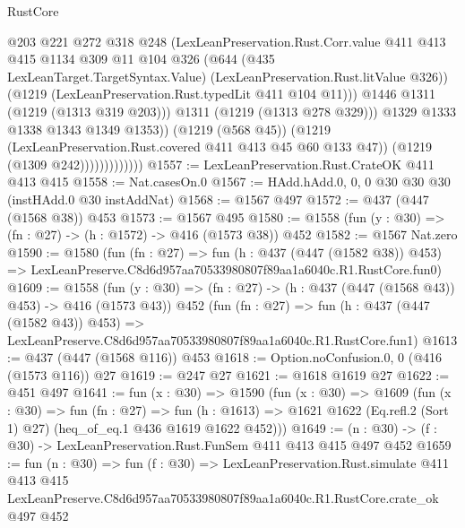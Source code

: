 \begin{lexlean}{RustCore}
\begin{coremodule}
                                  @203
                                  @221
                                  @272
                                  @318
                                  @248
                                  (LexLeanPreservation.Rust.Corr.value
                                    @411
                                    @413
                                    @415
                                    @1134
                                    @309
                                    @11
                                    @104
                                    @326
                                    (@644
                                      (@435 LexLeanTarget.TargetSyntax.Value)
                                      (LexLeanPreservation.Rust.litValue @326))
                                    (@1219 (LexLeanPreservation.Rust.typedLit @411 @104 @11)))
                                  @1446
                                  @1311
                                  (@1219 (@1313 @319 @203)))
                                @1311
                                (@1219 (@1313 @278 @329)))
                              @1329
                              @1333
                              @1338
                              @1343
                              @1349
                              @1353))
                          (@1219 (@568 @45))
                          (@1219 (LexLeanPreservation.Rust.covered @411 @413 @45 @60 @133 @47))
                          (@1219 (@1309 @242)))))))))))))
@1557 := LexLeanPreservation.Rust.CrateOK @411 @413 @415
@1558 := Nat.casesOn.{0}
@1567 := HAdd.hAdd.{0, 0, 0} @30 @30 @30 (instHAdd.{0} @30 instAddNat)
@1568 := @1567 @497
@1572 := @437 (@447 (@1568 @38)) @453
@1573 := @1567 @495
@1580 := @1558 (fun (y : @30) => (fn : @27) -> (h : @1572) -> @416 (@1573 @38)) @452
@1582 := @1567 Nat.zero
@1590 := @1580
    (fun (fn : @27) =>
    fun (h : @437 (@447 (@1582 @38)) @453) =>
    LexLeanPreserve.C8d6d957aa70533980807f89aa1a6040c.R1.RustCore.fun0)
@1609 := @1558
    (fun (y : @30) => (fn : @27) -> (h : @437 (@447 (@1568 @43)) @453) -> @416 (@1573 @43))
    @452
    (fun (fn : @27) =>
    fun (h : @437 (@447 (@1582 @43)) @453) =>
    LexLeanPreserve.C8d6d957aa70533980807f89aa1a6040c.R1.RustCore.fun1)
@1613 := @437 (@447 (@1568 @116)) @453
@1618 := Option.noConfusion.{0, 0} (@416 (@1573 @116)) @27
@1619 := @247 @27
@1621 := @1618 @1619 @27
@1622 := @451 @497
@1641 := fun (x : @30) =>
  @1590
    (fun (x : @30) =>
    @1609
      (fun (x : @30) =>
      fun (fn : @27) =>
      fun (h : @1613) =>
      @1621 @1622 (Eq.refl.{2} (Sort 1) @27) (heq_of_eq.{1} @436 @1619 @1622 @452)))
@1649 := (n : @30) -> (f : @30) -> LexLeanPreservation.Rust.FunSem @411 @413 @415 @497 @452
@1659 := fun (n : @30) =>
  fun (f : @30) =>
  LexLeanPreservation.Rust.simulate
    @411
    @413
    @415
    LexLeanPreserve.C8d6d957aa70533980807f89aa1a6040c.R1.RustCore.crate_ok
    @497
    @452
\end{coremodule}
\end{lexlean}
